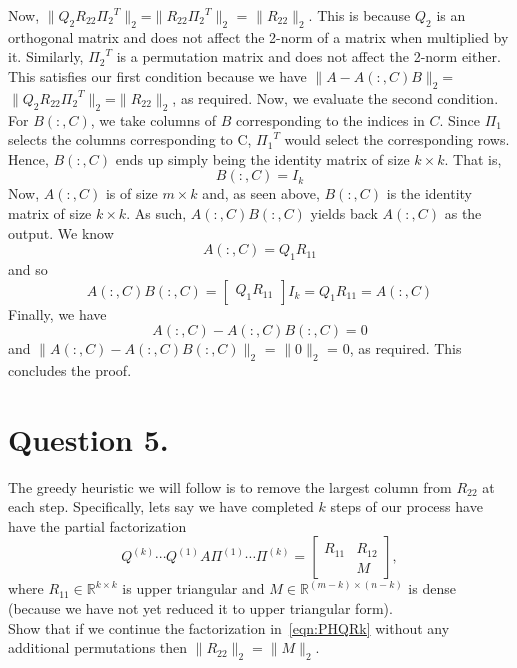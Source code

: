 \documentclass[12pt]{article}
\newcommand{\R}{\mathbb{R}}
\begin{document}
Now, $\|Q_2R_{22}{\Pi_2}^T\|_2$=$\|R_{22}{\Pi_2}^T\|_2$ = $\|R_{22}\|_2$.
This is because $Q_2$ is an orthogonal matrix and does not affect the 2-norm of a matrix when multiplied by it. Similarly, ${\Pi_2}^T$ is a permutation matrix and does not affect the 2-norm either. This satisfies our first condition because we have $\|A - A(:,C)B\|_2$=$\|Q_2R_{22}{\Pi_2}^T\|_2$=$\|R_{22}\|_2$, as required.
Now, we evaluate the second condition. For $B(:,C)$, we take columns of $B$ corresponding to the indices in $C$. Since ${\Pi_1}$ selects the columns corresponding to C, ${\Pi_1}^T$ would select the corresponding rows. Hence, $B(:,C)$ ends up simply being the identity matrix of size  $k \times k$.
That is, \[B(:,C)=I_k\]
Now, $A(:,C)$ is of size  $m \times k$ and, as seen above, $B(:,C)$ is the identity matrix of size  $k \times k$. As such, $A(:,C)B(:,C)$ yields back $A(:,C)$ as the output.
We know \[A(:,C)=Q_1R_{11}\] and so 
\[ A(:,C)B(:,C) = \begin{bmatrix}Q_1R_{11}\end{bmatrix}I_k=Q_1R_{11}=A(:,C)\]
Finally, we have \[ A(:,C) - A(:,C)B(:,C) = 0\] and $\|A(:,C) - A(:,C)B(:,C)\|_2$ = $\|0\|_2$ = 0, as required. This concludes the proof.

\section*{Question 5.}
The greedy heuristic we will follow is to remove the largest column from $R_{22}$ at each step. Specifically, lets say we have completed $k$ steps of our process have have the partial factorization
\begin{equation}
    \label{eqn:PHQRk}
    Q^{(k)}\cdots Q^{(1)}A\Pi^{(1)}\cdots\Pi^{(k)} = \begin{bmatrix} R_{11} & R_{12} \\ & M\end{bmatrix},
\end{equation}
where $R_{11}\in\R^{k\times k}$ is upper triangular and $M\in\R^{(m-k)\times (n-k)}$ is dense (because we have not yet reduced it to upper triangular form). \\

Show that if we continue the factorization in~\cref{eqn:PHQRk} without any additional permutations then $\|R_{22}\|_2 = \|M\|_2.$
\end{document}

